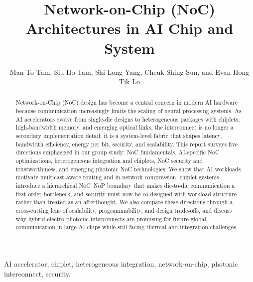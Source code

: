 \documentclass[journal]{IEEEtran}
\begin{document}
\title{Network-on-Chip (NoC) Architectures in AI Chip and System}

\author{Man To Tam, Siu Ho Tam, Shi Long Yang, Cheuk Shing Sun, and Evan Hong Tik Lo}


\maketitle

\begin{abstract}
Network-on-Chip (NoC) design has become a central concern in modern AI hardware because communication increasingly limits the scaling of neural processing systems. As AI accelerators evolve from single-die designs to heterogeneous packages with chiplets, high-bandwidth memory, and emerging optical links, the interconnect is no longer a secondary implementation detail; it is a system-level fabric that shapes latency, bandwidth efficiency, energy per bit, security, and scalability. This report surveys five directions emphasized in our group study: NoC fundamentals, AI-specific NoC optimizations, heterogeneous integration and chiplets, NoC security and trustworthiness, and emerging photonic NoC technologies. We show that AI workloads motivate multicast-aware routing and in-network compression, chiplet systems introduce a hierarchical NoC--NoP boundary that makes die-to-die communication a first-order bottleneck, and security must now be co-designed with workload structure rather than treated as an afterthought. We also compare these directions through a cross-cutting lens of scalability, programmability, and design trade-offs, and discuss why hybrid electro-photonic interconnects are promising for future global communication in large AI chips while still facing thermal and integration challenges.
\end{abstract}

\begin{IEEEkeywords}
AI accelerator, chiplet, heterogeneous integration, network-on-chip, photonic interconnect, security.
\end{IEEEkeywords}









\newpage


\end{document}
